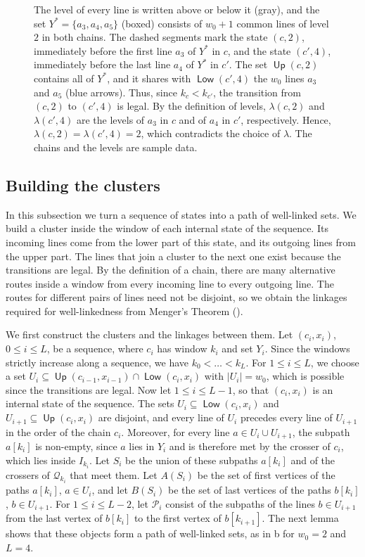 \documentclass[fontsize=12pt,leading=14pt]{fullpaper}
\DeclareMathOperator{\up}{\mathsf{Up}}
\DeclareMathOperator{\dn}{\mathsf{Low}}
\newcommand{\Pcal}{\mathcal{P}}
\newcommand{\Qcal}{\mathcal{Q}}
\begin{document}
\begin{figure}[ht]
{    The level of every line is written above or below it (gray), and the set $Y^*=\{a_3,a_4,a_5\}$ (boxed) consists of $w_0+1$ common lines of level $2$ in both chains.
    The dashed segments mark the state $(c,2)$, immediately before the first line $a_3$ of $Y^*$ in $c$, and the state $(c',4)$, immediately before the last line $a_4$ of $Y^*$ in $c'$.
    The set $\up(c,2)$ contains all of $Y^*$, and it shares with $\dn(c',4)$ the $w_0$ lines $a_3$ and $a_5$ (blue arrows).
    Thus, since $k_c<k_{c'}$, the transition from $(c,2)$ to $(c',4)$ is legal.
    By the definition of levels, $\lambda(c,2)$ and $\lambda(c',4)$ are the levels of $a_3$ in $c$ and of $a_4$ in $c'$, respectively.
    Hence, $\lambda(c,2)=\lambda(c',4)=2$, which contradicts the choice of $\lambda$.
  The chains and the levels are sample data.}
  \label{fig:levels}
\end{figure}

\subsection{Building the clusters}\label{sec:chains-clusters}

In this subsection we turn a sequence of states into a path of well-linked sets.
We build a cluster inside the window of each internal state of the sequence.
Its incoming lines come from the lower part of this state, and its outgoing lines from the upper part.
The lines that join a cluster to the next one exist because the transitions are legal.
By the definition of a chain, there are many alternative routes inside a window from every incoming line to every outgoing line.
The routes for different pairs of lines need not be disjoint, so we obtain the linkages required for well-linkedness from Menger's Theorem ().

We first construct the clusters and the linkages between them.
Let $(c_i,x_i)$, $0\le i\le L$, be a sequence, where $c_i$ has window $k_i$ and set $Y_i$.
Since the windows strictly increase along a sequence, we have $k_0<\dots<k_L$.
For $1\le i\le L$, we choose a set $U_i\subseteq\up(c_{i-1},x_{i-1})\cap\dn(c_i,x_i)$ with $|U_i|=w_0$, which is possible since the transitions are legal.
Now let $1\le i\le L-1$, so that $(c_i,x_i)$ is an internal state of the sequence.
The sets $U_i\subseteq\dn(c_i,x_i)$ and $U_{i+1}\subseteq\up(c_i,x_i)$ are disjoint, and every line of $U_i$ precedes every line of $U_{i+1}$ in the order of the chain $c_i$.
Moreover, for every line $a\in U_i\cup U_{i+1}$, the subpath $a[k_i]$ is non-empty, since $a$ lies in $Y_i$ and is therefore met by the crosser of $c_i$, which lies inside $I_{k_i}$.
Let $S_i$ be the union of these subpaths $a[k_i]$ and of the crossers of $\Qcal_{k_i}$ that meet them.
Let $A(S_i)$ be the set of first vertices of the paths $a[k_i]$, $a\in U_i$, and let $B(S_i)$ be the set of last vertices of the paths $b[k_i]$, $b\in U_{i+1}$.
For $1\le i\le L-2$, let $\Pcal_i$ consist of the subpaths of the lines $b\in U_{i+1}$ from the last vertex of $b[k_i]$ to the first vertex of $b[k_{i+1}]$.
The next lemma shows that these objects form a path of well-linked sets, as in b for $w_0=2$ and $L=4$.
\end{document}
